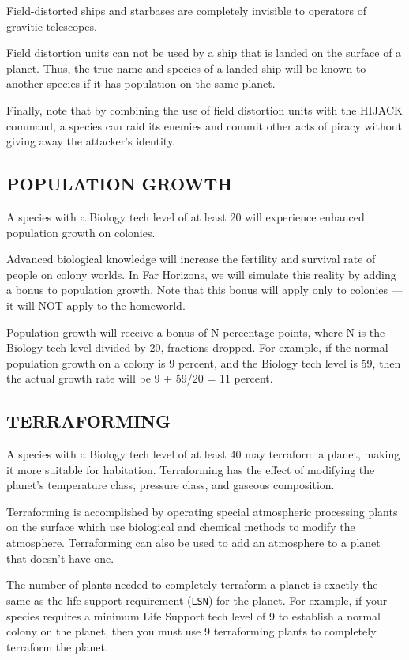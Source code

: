 \documentclass[10pt,titlepage]{article}
\begin{document}
Field-distorted ships and starbases are completely invisible to operators of
gravitic telescopes.

Field distortion units can not be used by a ship that is landed on the surface
of a planet.  Thus, the true name and species of a landed ship will be known
to another species if it has population on the same planet.

Finally, note that by combining the use of field distortion units with the
HIJACK command, a species can raid its enemies and commit other acts of piracy
without giving away the attacker's identity.

\newpage
\subsection{POPULATION GROWTH}

A species with a Biology tech level of at least 20 will experience enhanced
population growth on colonies.

Advanced biological knowledge will increase the fertility and survival rate of
people on colony worlds.  In Far Horizons, we will simulate this reality by
adding a bonus to population growth.  Note that this bonus will apply only to
colonies --- it will NOT apply to the homeworld.

Population growth will receive a bonus of N percentage points, where N is the
Biology tech level divided by 20, fractions dropped.  For example, if the
normal population growth on a colony is 9 percent, and the Biology tech level
is 59, then the actual growth rate will be 9 + 59/20 = 11 percent.

\newpage
\subsection{TERRAFORMING}

A species with a Biology tech level of at least 40 may terraform a planet,
making it more suitable for habitation.  Terraforming has the effect of
modifying the planet's temperature class, pressure class, and gaseous
composition.

Terraforming is accomplished by operating special atmospheric processing
plants on the surface which use biological and chemical methods to modify
the atmosphere.  Terraforming can also be used to add an atmosphere to a planet
that doesn't have one.

The number of plants needed to completely terraform a planet is exactly the
same as the life support requirement (\texttt{LSN}) for the planet.  For example, if
your species requires a minimum Life Support tech level of 9 to establish
a normal colony on the planet, then you must use 9 terraforming plants to
completely terraform the planet.
\end{document}

